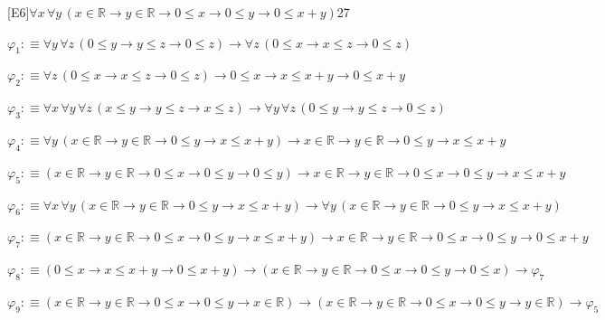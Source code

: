 \begin{fullproof}{[E6]}{$\forall x\,\forall y\,(x \in \mathbb{R} \to y \in \mathbb{R} \to 0 \leq x \to 0 \leq y \to 0 \leq x + y)$}{27}
\begin{ptree}
\noLine
{}
\end{ptree}
\begin{abbrevlist}
\item $\varphi_{1} :\equiv \forall y\,\forall z\,(0 \leq y \to y \leq z \to 0 \leq z) \to \forall z\,(0 \leq x \to x \leq z \to 0 \leq z)$
\item $\varphi_{2} :\equiv \forall z\,(0 \leq x \to x \leq z \to 0 \leq z) \to 0 \leq x \to x \leq x + y \to 0 \leq x + y$
\item $\varphi_{3} :\equiv \forall x\,\forall y\,\forall z\,(x \leq y \to y \leq z \to x \leq z) \to \forall y\,\forall z\,(0 \leq y \to y \leq z \to 0 \leq z)$
\item $\varphi_{4} :\equiv \forall y\,(x \in \mathbb{R} \to y \in \mathbb{R} \to 0 \leq y \to x \leq x + y) \to x \in \mathbb{R} \to y \in \mathbb{R} \to 0 \leq y \to x \leq x + y$
\item $\varphi_{5} :\equiv (x \in \mathbb{R} \to y \in \mathbb{R} \to 0 \leq x \to 0 \leq y \to 0 \leq y) \to x \in \mathbb{R} \to y \in \mathbb{R} \to 0 \leq x \to 0 \leq y \to x \leq x + y$
\item $\varphi_{6} :\equiv \forall x\,\forall y\,(x \in \mathbb{R} \to y \in \mathbb{R} \to 0 \leq y \to x \leq x + y) \to \forall y\,(x \in \mathbb{R} \to y \in \mathbb{R} \to 0 \leq y \to x \leq x + y)$
\item $\varphi_{7} :\equiv (x \in \mathbb{R} \to y \in \mathbb{R} \to 0 \leq x \to 0 \leq y \to x \leq x + y) \to x \in \mathbb{R} \to y \in \mathbb{R} \to 0 \leq x \to 0 \leq y \to 0 \leq x + y$
\item $\varphi_{8} :\equiv (0 \leq x \to x \leq x + y \to 0 \leq x + y) \to (x \in \mathbb{R} \to y \in \mathbb{R} \to 0 \leq x \to 0 \leq y \to 0 \leq x) \to \varphi_{7}$
\item $\varphi_{9} :\equiv (x \in \mathbb{R} \to y \in \mathbb{R} \to 0 \leq x \to 0 \leq y \to x \in \mathbb{R}) \to (x \in \mathbb{R} \to y \in \mathbb{R} \to 0 \leq x \to 0 \leq y \to y \in \mathbb{R}) \to \varphi_{5}$
\end{abbrevlist}
\end{fullproof}
